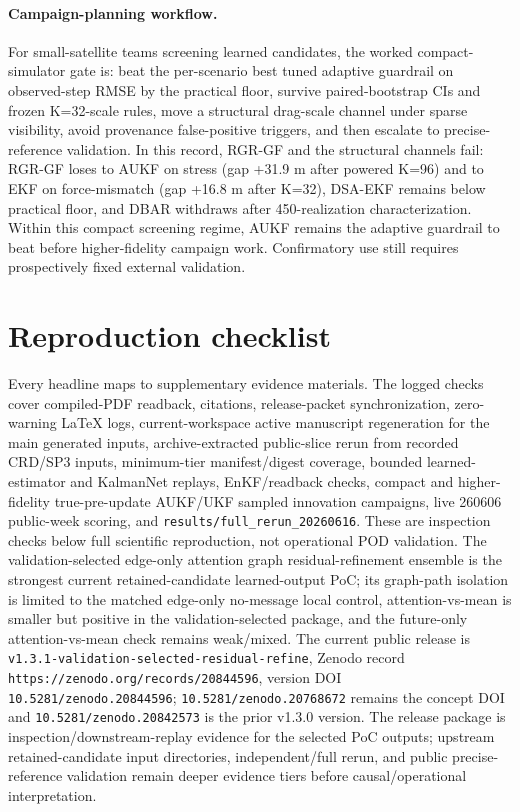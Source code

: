 \documentclass{article}
\begin{document}
\paragraph{Campaign-planning workflow.}
For small-satellite teams screening learned candidates, the worked compact-simulator gate is: beat the per-scenario best tuned adaptive guardrail on observed-step RMSE by the practical floor, survive paired-bootstrap CIs and frozen K=32-scale rules, move a structural drag-scale channel under sparse visibility, avoid provenance false-positive triggers, and then escalate to precise-reference validation. In this record, RGR-GF and the structural channels fail: RGR-GF loses to AUKF on stress (gap +31.9 m after powered K=96) and to EKF on force-mismatch (gap +16.8 m after K=32), DSA-EKF remains below practical floor, and DBAR withdraws after 450-realization characterization. Within this compact screening regime, AUKF remains the adaptive guardrail to beat before higher-fidelity campaign work. Confirmatory use still requires prospectively fixed external validation.

\section{Reproduction checklist}\label{sec:repro-checklist}
Every headline maps to supplementary evidence materials. The logged checks cover compiled-PDF readback, citations, release-packet synchronization, zero-warning LaTeX logs, current-workspace active manuscript regeneration for the main generated inputs, archive-extracted public-slice rerun from recorded CRD/SP3 inputs, minimum-tier manifest/digest coverage, bounded learned-estimator and KalmanNet replays, EnKF/readback checks, compact and higher-fidelity true-pre-update AUKF/UKF sampled innovation campaigns, live 260606 public-week scoring, and \texttt{results/full\_rerun\_20260616}. These are inspection checks below full scientific reproduction, not operational POD validation. The validation-selected edge-only attention graph residual-refinement ensemble is the strongest current retained-candidate learned-output PoC; its graph-path isolation is limited to the matched edge-only no-message local control, attention-vs-mean is smaller but positive in the validation-selected package, and the future-only attention-vs-mean check remains weak/mixed. The current public release is \texttt{v1.3.1-validation-selected-residual-refine}, Zenodo record \nolinkurl{https://zenodo.org/records/20844596}, version DOI \nolinkurl{10.5281/zenodo.20844596}; \nolinkurl{10.5281/zenodo.20768672} remains the concept DOI and \nolinkurl{10.5281/zenodo.20842573} is the prior v1.3.0 version. The release package is inspection/downstream-replay evidence for the selected PoC outputs; upstream retained-candidate input directories, independent/full rerun, and public precise-reference validation remain deeper evidence tiers before causal/operational interpretation.
\end{document}
